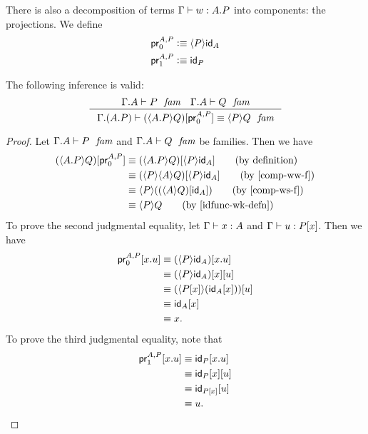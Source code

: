 There is also a decomposition of terms $\jterm{\Gamma}{\ctxext{A}{P}}{w}$ into
components: the projections. We define
\begin{align*}
\cprojfstf{A}{P} & \defeq \ctxwk{P}{\idfunc[A]}\\
\cprojsndf{A}{P} & \defeq \idfunc[P]
\end{align*}

\begin{lem}
The following inference is valid:
\begin{equation*}
\inference{\jfam{\ctxext{\Gamma}{A}}{P}\quad\jfam{\ctxext{\Gamma}{A}}{Q}}
{\jfameq{\ctxext{\Gamma}{{A}{P}}}{\subst{\cprojfstf{A}{P}}{\ctxwk{\ctxext{A}{P}}{Q}}}{\ctxwk{P}{Q}}}
\end{equation*}
\end{lem}

\begin{proof}
Let $\jfam{\ctxext{\Gamma}{A}}{P}$ and $\jfam{\ctxext{\Gamma}{A}}{Q}$ be
families. Then we have
\begin{align*}
\subst{\cprojfstf{A}{P}}{\ctxwk{\ctxext{A}{P}}{Q}} 
& \jdeq \subst{\ctxwk{P}{\idfunc[A]}}{\ctxwk{\ctxext{A}{P}}{Q}} \tag{by definition}\\
& \jdeq \subst{\ctxwk{P}{\idfunc[A]}}{\ctxwk{P}{{A}{Q}}} \tag{by \autoref{comp-ww-f}}\\
& \jdeq \ctxwk{P}{\subst{\idfunc[A]}{\ctxwk{A}{Q}}} \tag{by \autoref{comp-ws-f}}\\
& \jdeq \ctxwk{P}{Q} \tag{by \autoref{idfunc-wk-defn}}
\end{align*}
To prove the second judgmental equality, let $\jterm{\Gamma}{A}{x}$ and
$\jterm{\Gamma}{\subst{x}{P}}{u}$. Then we have
\begin{align*}
\cprojfst{A}{P}{\ctxext{x}{u}}
& \jdeq \subst{\ctxext{x}{u}}{\ctxwk{P}{\idfunc[A]}}\\
& \jdeq \subst{u}{{x}{\ctxwk{P}{\idfunc[A]}}} \\
& \jdeq \subst{u}{\ctxwk{\subst{x}{P}}{\subst{x}{\idfunc[A]}}}\\
& \jdeq \subst{x}{\idfunc[A]}\\
& \jdeq x.
\end{align*}
To prove the third judgmental equality, note that
\begin{align*}
\cprojsnd{A}{P}{\ctxext{x}{u}}
& \jdeq \subst{\ctxext{x}{u}}{\idfunc[P]}\\
& \jdeq \subst{u}{{x}{\idfunc[P]}}\\
& \jdeq \subst{u}{\idfunc[\subst{x}{P}]}\\
& \jdeq u.
\end{align*}
\end{proof}

